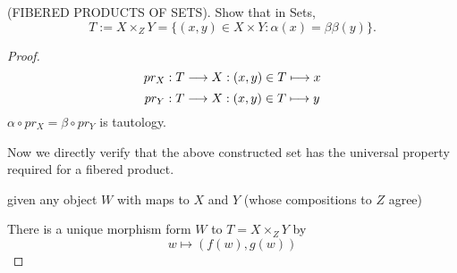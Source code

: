 \documentclass[11pt,fleqn]{book} %
\begin{document}
\begin{exr}
(FIBERED PRODUCTS OF SETS). Show that in Sets,
$$
T:=X\times_Z Y=\{(x,y)\in X\times Y : \alpha(x)=β\beta(y)\}.$$
\end{exr}
\begin{proof}
$$
pr_X:T\longrightarrow X:(x,y)\in T\longmapsto x
$$
$$
pr_Y:T\longrightarrow X:(x,y)\in T\longmapsto y
$$
$\alpha\circ pr_X=\beta\circ pr_Y$ is tautology.

Now we directly verify that the above constructed set has the universal property required for a fibered product.
\begin{center}
\end{center}
given any object $W $ with maps to $X$ and $Y$ (whose compositions to $Z$ agree)

There is a unique morphism form $W$ to $T=X\times_Z Y$ by 
$$
w\longmapsto (f(w), g(w))
$$
\end{proof}
\end{document}
